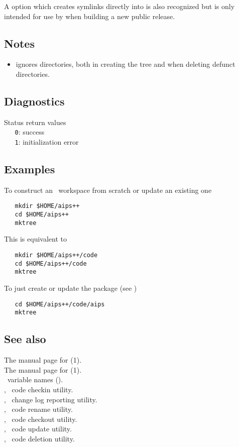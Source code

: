A  option which creates  symlinks directly into
 is also recognized but is only intended for use by
 when building a new public release.

\subsection*{Notes}
 
\begin{itemize}
\item
    ignores  directories, both in creating the tree
   and when deleting defunct directories.
\end{itemize}

\subsection*{Diagnostics}

Status return values
\\ \verb+   0+: success
\\ \verb+   1+: initialization error

\subsection*{Examples}

To construct an \aipspp\ workspace from scratch or update an existing one

\begin{verbatim}
   mkdir $HOME/aips++
   cd $HOME/aips++
   mktree
\end{verbatim}

\noindent
This is equivalent to

\begin{verbatim}
   mkdir $HOME/aips++/code
   cd $HOME/aips++/code
   mktree
\end{verbatim}

\noindent
To just create or update the  package (see )

\begin{verbatim}
   cd $HOME/aips++/code/aips
   mktree
\end{verbatim}

\subsection*{See also}

The manual page for (1).\\
The manual page for (1).\\
\aipspp\ variable names ().\\
, \aipspp\ code checkin utility.\\
, \aipspp\ change log reporting utility.\\
, \aipspp\ code rename utility.\\
, \aipspp\ code checkout utility.\\
, \aipspp\ code update utility.\\
, \aipspp\ code deletion utility.

